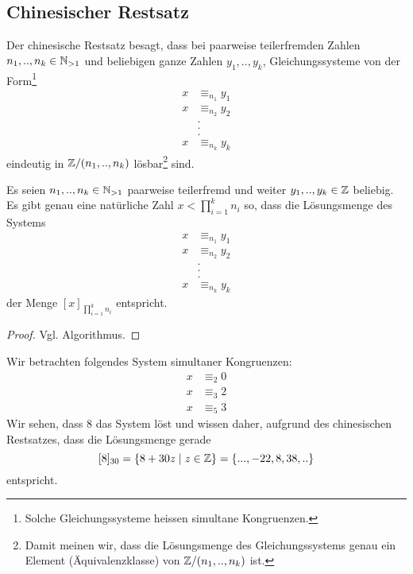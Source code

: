 \subsection{Chinesischer Restsatz}

Der chinesische Restsatz besagt, dass bei paarweise teilerfremden Zahlen $n_1,..,n_k\in\mathbb{N}_{>1}$ und beliebigen ganze Zahlen $y_1,..,y_k$, Gleichungssysteme von der Form\footnote{Solche Gleichungssysteme heissen simultane Kongruenzen.}
\begin{align*}
 x&\equiv_{n_1} y_1\\
x&\equiv_{n_2} y_2\\
&.\\
&.\\
&.\\
x&\equiv_{n_k} y_k
\end{align*}
eindeutig in $\mathbb{Z}/(n_1,..,n_k)$ lösbar\footnote{Damit meinen wir, dass die Lösungsmenge des Gleichungssystems genau ein Element (Äquivalenzklasse) von $\mathbb{Z}/(n_1,..,n_k)$ ist.} sind.

\begin{satz}
 Es seien $n_1,..,n_k\in\mathbb{N}_{>1}$ paarweise teilerfremd und weiter $y_1,..,y_k\in\mathbb{Z}$ beliebig. Es gibt genau eine natürliche Zahl $x<\prod_{i=1}^kn_i$ so, dass die Lösungsmenge des Systems
\begin{align*}
 x&\equiv_{n_1} y_1\\
x&\equiv_{n_2} y_2\\
&.\\
&.\\
&.\\
x&\equiv_{n_k} y_k
\end{align*}
der Menge $[x]_{\prod_{i=1}^kn_i}$ entspricht.
\end{satz}
\begin{proof}
Vgl. Algorithmus.
\end{proof}

\begin{bsp}
 Wir betrachten folgendes System simultaner Kongruenzen:
\begin{align*}
x&\equiv_{2} 0\\
x&\equiv_{3} 2\\
x&\equiv_{5} 3
\end{align*}
Wir sehen, dass $8$ das System löst und wissen daher, aufgrund des chinesischen Restsatzes, dass die Lösungsmenge gerade
\[
 [8]_{30}=\{8+30z\mid z\in\mathbb{Z}\}=\{...,-22,8,38,..\}
\]
entspricht.
\end{bsp}

